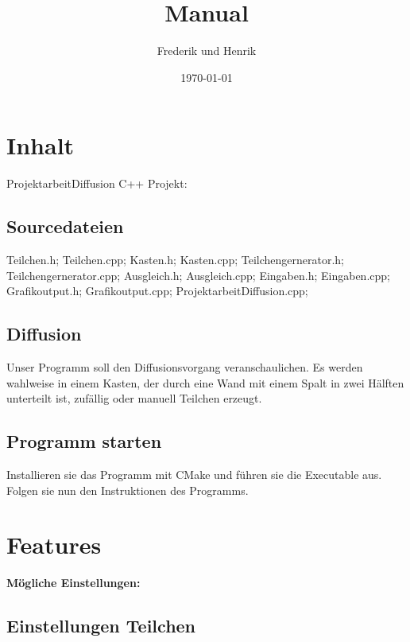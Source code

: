 \documentclass[14pt,a4paper]{scrartcl}
\title{Manual}
\author{Frederik und Henrik}
\date{\today}
\begin{document}
 
\maketitle
\tableofcontents
\newpage
\section{Inhalt}
ProjektarbeitDiffusion C++ Projekt:

\subsection{Sourcedateien}
Teilchen.h;
Teilchen.cpp;
Kasten.h;
Kasten.cpp;
Teilchengernerator.h;
Teilchengernerator.cpp;
Ausgleich.h;
Ausgleich.cpp;
Eingaben.h;
Eingaben.cpp;
Grafikoutput.h;
Grafikoutput.cpp;
ProjektarbeitDiffusion.cpp;

\subsection{Diffusion}
Unser Programm soll den Diffusionsvorgang veranschaulichen.
Es werden wahlweise in einem Kasten, der durch eine Wand mit einem Spalt in zwei Hälften unterteilt ist, zufällig oder manuell Teilchen erzeugt.

\subsection{Programm starten}
Installieren sie das Programm mit CMake und führen sie die Executable aus.
Folgen sie nun den Instruktionen des Programms.

\section{Features}
\textbf{Mögliche Einstellungen:}

\subsection{Einstellungen Teilchen}
\end{document}

